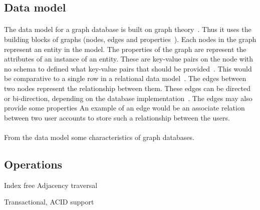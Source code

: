 \documentclass{CRPITStyle}
\renewcommand{\cite}{\citep}
\begin{document}
\subsection{Data model}

\paragraph{}
The data model for a graph database is built on graph
theory~\cite{nosql_survey,sql_nosql,graphdb}.
Thus it uses the building blocks of graphs (nodes, edges and
properties~\cite{graphdb}).
Each nodes in the graph represent an entity in the model.
The properties of the graph are represent the attributes of 
an instance of an entity.
These are key-value pairs on the node with no schema to defined what
key-value pairs that should be provided~\cite{neo4j}.
This would be comparative to a single row in a relational data
model~\cite{relational_db}.
The edges between two nodes represent the relationship between
them.
These edges can be directed or bi-direction, depending on the database
implementation~\cite{graphdb,neo4j}.
The edges may also provide some properties
An example of an edge would be an associate relation between two user accounts
to store such a relationship between the users.

\paragraph{}
From the data model some characteristics of graph databases.

\cite{sql_nosql}

\cite{sql_nosql}

\cite{sql_nosql}

\cite{sql_nosql}

\subsection{Operations}

Index free Adjacency  traversal~\cite{type_nosql}

Transactional, ACID support~\cite{type_nosql}
\end{document}
